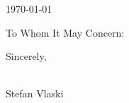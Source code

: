 \documentclass[
]{ImperialLetterhead}
\begin{document}


\today %


\bigskip %

To Whom It May Concern:



Sincerely,

\\ %
Stefan Vlaski

\end{document}
